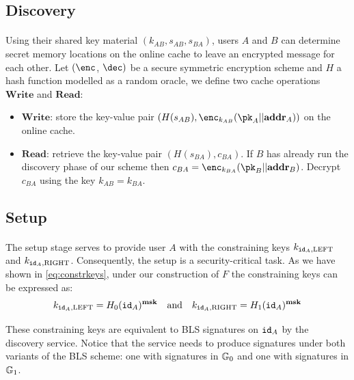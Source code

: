 	\subsection{Discovery}
	
		\paragraph{} Using their shared key material $(k_{AB}, s_{AB}, s_{BA})$, users $A$ and $B$ can determine secret memory locations on the online cache to leave an encrypted message for each other. Let $(\enc$, $\dec)$ be a secure symmetric encryption scheme and $H$ a hash function modelled as a random oracle, we define two cache operations $\mathbf{Write}$ and $\mathbf{Read}$:
		\begin{itemize}
			\item $\mathbf{Write}$: store the key-value pair $(H(s_{AB}), \enc_{k_{AB}}(\pk_A || \addr_A))$ on the online cache.
			\item $\mathbf{Read}$: retrieve the key-value pair $(H(s_{BA}), c_{BA})$. If $B$ has already run the discovery phase of our scheme then $c_{BA} = \enc_{k_{BA}}(\pk_B||\addr_B)$. Decrypt $c_{BA}$ using the key $k_{AB} = k_{BA}$.
		\end{itemize}
	
	\subsection{Setup}
	\label{sec:setup}
		
		\paragraph{}  The setup stage serves to provide user $A$ with the constraining keys $k_{\mathtt{id}_A,\mathrm{LEFT}}$ and $k_{\mathtt{id}_A,\mathrm{RIGHT}}$. Consequently, the setup is a security-critical task. As we have shown in \autoref{eq:constrkeys}, under our construction of $F$ the constraining keys can be expressed as:
		\begin{equation}
			k_{\mathtt{id}_A,\mathrm{LEFT}} = H_0(\mathtt{id}_A)^{\mathbf{msk}} \quad \mathrm{and} \quad k_{\mathtt{id}_A,\mathrm{RIGHT}} = H_1(\mathtt{id}_A)^{\mathbf{msk}}
		\end{equation}
		
		\noindent These constraining keys are equivalent to BLS signatures on $\mathtt{id}_A$ by the discovery service. Notice that the service needs to produce signatures under both variants of the BLS scheme: one with signatures in $\mathbb{G}_0$ and one with signatures in $\mathbb{G}_1$.
				
